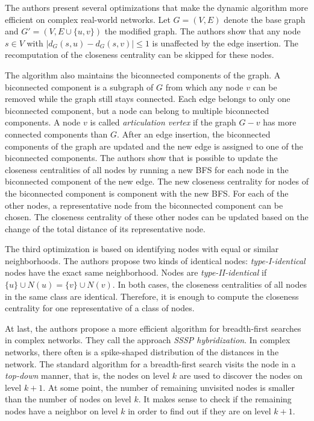 The authors present several optimizations that make the dynamic algorithm more efficient on complex real-world networks. Let $G = (V, E)$ denote the base graph and $G' = (V, E \cup \{u, v\})$ the modified graph. The authors show that any node $s \in V$ with $|d_G(s, u) - d_G(s, v)| \leq 1$ is unaffected by the edge insertion. The recomputation of the closeness centrality can be skipped for these nodes.

The algorithm also maintains the biconnected components of the graph. A biconnected component is a subgraph of $G$ from which any node $v$ can be removed while the graph still stays connected. Each edge belongs to only one biconnected component, but a node can belong to multiple biconnected components. A node $v$ is called \emph{articulation vertex} if the  graph $G - v$ has more connected components than $G$. After an edge insertion, the biconnected components of the graph are updated and the new edge is assigned to one of the biconnected components. The authors show that is possible to update the closeness centralities of all nodes by running a new BFS for each node in the biconnected component of the new edge. The new closeness centrality for nodes of the biconnected component is component with the new BFS. For each of the other nodes, a representative node from the biconnected component can be chosen. The closeness centrality of these other nodes can be updated based on the change of the total distance of its representative node.

The third optimization is based on identifying nodes with equal or similar neighborhoods. The authors propose two kinds of identical nodes: \emph{type-I-identical} nodes have the exact same neighborhood. Nodes are \emph{type-II-identical} if $\{u\} \cup N(u) = \{v\} \cup N(v)$. In both cases, the closeness centralities of all nodes in the same class are identical. Therefore, it is enough to compute the closeness centrality for one representative of a class of nodes.

At last, the authors propose a more efficient algorithm for breadth-first searches in complex networks. They call the approach \emph{SSSP hybridization}. In complex networks, there often is a spike-shaped distribution of the distances in the network. The standard algorithm for a breadth-first search visits the node in a \emph{top-down} manner, that is, the nodes on level $k$ are used to discover the nodes on level $k + 1$. At some point, the number of remaining unvisited nodes is smaller than the number of nodes on level $k$. It makes sense to check if the remaining nodes have a neighbor on level $k$ in order to find out if they are on level $k + 1$.

